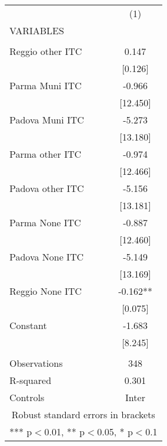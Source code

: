 \begin{tabular}{lc} \hline
 & (1) \\
VARIABLES &  \\ \hline
 &  \\
Reggio other ITC & 0.147 \\
 & [0.126] \\
Parma Muni ITC & -0.966 \\
 & [12.450] \\
Padova Muni ITC & -5.273 \\
 & [13.180] \\
Parma other ITC & -0.974 \\
 & [12.466] \\
Padova other ITC & -5.156 \\
 & [13.181] \\
Parma None ITC & -0.887 \\
 & [12.460] \\
Padova None ITC & -5.149 \\
 & [13.169] \\
Reggio None ITC & -0.162** \\
 & [0.075] \\
Constant & -1.683 \\
 & [8.245] \\
 &  \\
Observations & 348 \\
R-squared & 0.301 \\
 Controls & Inter \\ \hline
\multicolumn{2}{c}{ Robust standard errors in brackets} \\
\multicolumn{2}{c}{ *** p$<$0.01, ** p$<$0.05, * p$<$0.1} \\
\end{tabular}
